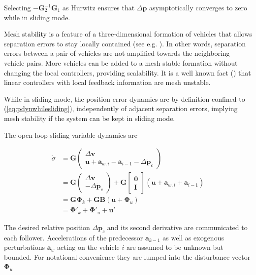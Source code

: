 \documentclass{ifacconf}
\providecommand{\mbf}[1]{\mathbf{#1}}
\newcommand{\idxFollower}{{\ensuremath{i} }}
\newcommand{\idxPredecessor}{{\ensuremath{i-1} }}
\begin{document}
Selecting $- \mbf{G}_2^{-1} \mbf{G}_1$ as Hurwitz ensures that $\Delta \mbf{p}$ asymptotically converges to zero while in sliding mode.

Mesh stability is a feature of a three-dimensional formation of vehicles that allows separation errors to stay locally contained (see e.g. \cite{Pant2002}). In other words, separation errors between a pair of vehicles are not amplified towards the neighboring vehicle pairs. More vehicles can be added to a mesh stable formation without changing the local controllers, providing scalability. It is a well known fact (\cite{Pant2002}) that linear controllers with local feedback information are mesh unstable.

While in sliding mode, the position error dynamics are by definition confined to (\ref{eq:pdynwhilesliding}), independently of adjacent separation errors, implying mesh stability if the system can be kept in sliding mode.

The open loop sliding variable dynamics are

\begin{align}
\dot{{\sigma}} &= \mbf{G}
\begin{pmatrix}
\Delta \mbf{v} \\
\mbf{u} + \mbf{a}_{w,\idxFollower}
 - \mbf{a}_\idxPredecessor -  \Delta \ddot{\mbf{p}}_c
\end{pmatrix}\\
& = \mbf{G}
\begin{pmatrix}
\Delta \mbf{v} \\
 - \Delta \ddot{\mbf{p}}_c
\end{pmatrix} 
+ \mbf{G}
\begin{bmatrix}
{\mbf{0}}\\
{\mbf{I}}
\end{bmatrix}
(\mbf{u} + \mbf{a}_{w,\idxFollower} + \mbf{a}_\idxPredecessor) \\
&= \mbf{G} \mbf{\Phi}_k + \mbf{G} \mbf{B}(
\mbf{u}
 + {\mbf\Phi}_u)
\label{eq:sigmadynconti}\\
&= \mbf{\Phi}'_k + \mbf{\Phi}'_u + \mbf{u}'
\label{eq:sigmadyncontishort}
\end{align}

The  desired relative position $\Delta \mbf{p}_c$ and its second derivative are communicated to each follower. Accelerations of the predecessor $\mbf{a}_{k-1}$ as well as exogenous perturbations $\mbf{a}_w $ acting on the vehicle $i$ are assumed to be unknown but bounded. For notational convenience they are lumped into the disturbance vector $\mbf{\Phi}_u$
\end{document}

